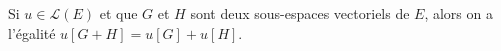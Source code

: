 Si $u\in \mathcal{L}(E)$ et que $G$ et $H$ sont deux sous-espaces vectoriels de $E$, alors on a l'égalité $u[G+H]=u[G]+u[H]$.

\begin{reponses}
\end{reponses}

